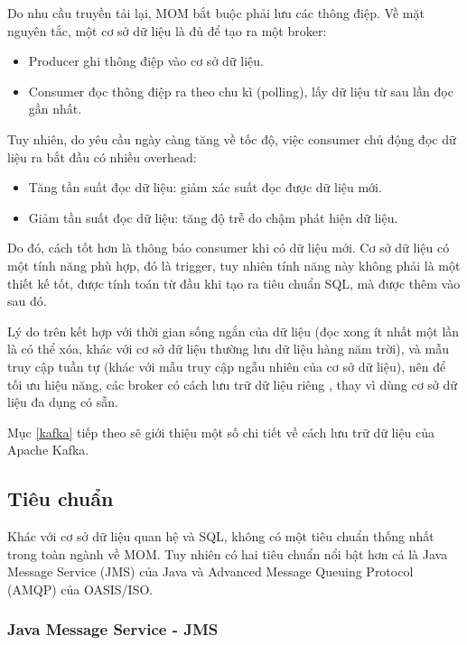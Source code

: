 \documentclass{article}
\begin{document}
Do nhu cầu truyền tải lại, MOM bắt buộc phải lưu các thông điệp. Về mặt nguyên
tắc, một cơ sở dữ liệu là đủ để tạo ra một broker:

\begin{itemize}
    \item Producer ghi thông điệp vào cơ sở dữ liệu.
    \item Consumer đọc thông điệp ra theo chu kì (polling), lấy dữ liệu từ sau
        lần đọc gần nhất.
\end{itemize}

Tuy nhiên, do yêu cầu ngày càng tăng về tốc độ, việc consumer chủ động đọc dữ
liệu ra bắt đầu có nhiều overhead:

\begin{itemize}
    \item Tăng tần suất đọc dữ liệu: giảm xác suất đọc được dữ liệu mới.
    \item Giảm tần suất đọc dữ liệu: tăng độ trễ do chậm phát hiện dữ liệu.
\end{itemize}

Do đó, cách tốt hơn là thông báo consumer khi có dữ liệu mới. Cơ sở dữ liệu có
một tính năng phù hợp, đó là trigger, tuy nhiên tính năng này không phải là một
thiết kế tốt, được tính toán từ đầu khi tạo ra tiêu chuẩn SQL, mà được thêm vào
sau đó.

Lý do trên kết hợp với thời gian sống ngắn của dữ liệu (đọc xong ít nhất một lần
là có thể xóa, khác với cơ sở dữ liệu thường lưu dữ liệu hàng năm trời), và mẫu
truy cập tuần tự (khác với mẫu truy cập ngẫu nhiên của cơ sở dữ liệu), nên để
tối ưu hiệu năng, các broker có cách lưu trữ dữ liệu riêng
\cite{monitor_stream}, thay vì dùng cơ sở dữ liệu đa dụng có sẵn.

Mục \ref{kafka} tiếp theo sẽ giới thiệu một số chi tiết về cách lưu trữ dữ liệu
của Apache Kafka.

\subsection{Tiêu chuẩn}

Khác với cơ sở dữ liệu quan hệ và SQL, không có một tiêu chuẩn thống nhất trong
toàn ngành về MOM. Tuy nhiên có hai tiêu chuẩn nổi bật hơn cả là Java Message
Service (JMS) của Java và Advanced Message Queuing Protocol (AMQP) của
OASIS/ISO.

\subsubsection{Java Message Service - JMS}
\end{document}
